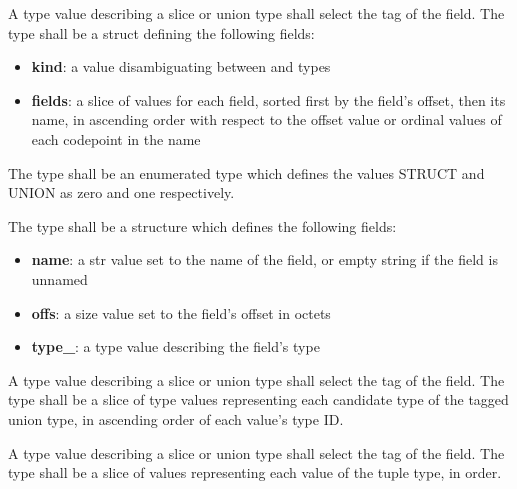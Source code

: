 
\specsubsubitem
A type value describing a slice or union type shall select the
 tag of the  field. The
 type shall be a struct defining the following
fields:

\begin{itemize}
\item \textbf{kind}: a  value disambiguating between  and  types
\item \textbf{fields}: a slice of  values for each field, sorted first by the field's offset, then its name, in ascending order with respect to the offset value or ordinal values of each codepoint in the name
\end{itemize}

\specsubsubitem
The  type shall be an enumerated type which defines
the values STRUCT and UNION as zero and one respectively.

\specsubsubitem
The  type shall be a structure which defines the
following fields:

\begin{itemize}
\item \textbf{name}: a str value set to the name of the field, or empty string if the field is unnamed
\item \textbf{offs}: a size value set to the field's offset in octets
\item \textbf{type\_}: a type value describing the field's type
\end{itemize}


\specsubsubitem
A type value describing a slice or union type shall select the
 tag of the  field. The
 type shall be a slice of type values representing each
candidate type of the tagged union type, in ascending order of each value's
type ID.


\specsubsubitem
A type value describing a slice or union type shall select the
 tag of the  field. The
 type shall be a slice of  values
representing each value of the tuple type, in order.

